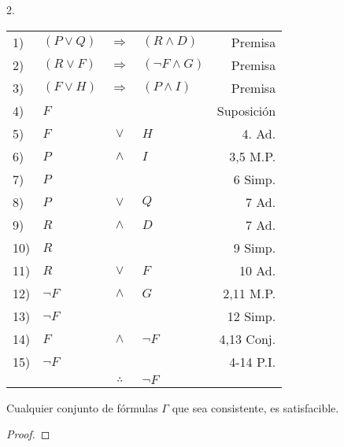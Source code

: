 \documentclass[12pt]{report}
\theoremstyle{largebreak}
\begin{document}
\begin{excer}
        2.
        \begin{center}
            \begin{tabular}{l l c l r}
                1) & $(P\lor Q)$ & $\Rightarrow$ & $(R\land D)$ & Premisa \\
                2) & $(R\lor F)$ & $\Rightarrow$ & $(\neg F\land G)$ & Premisa \\
                3) & $(F\lor H)$ & $\Rightarrow$ & $(P\land I)$ & Premisa \\
                4) & $F$ &  &  & Suposición \\
                5) & $F$ & $\lor$ & $H$ & 4. Ad. \\
                6) & $P$ & $\land$ & $I$ & 3,5 M.P. \\
                7) & $P$ &  &  & 6 Simp. \\
                8) & $P$ & $\lor$ & $Q$ & 7 Ad. \\
                9) & $R$ & $\land$ & $D$ & 7 Ad. \\
                10) & $R$ &  &  & 9 Simp. \\
                11) & $R$ & $\lor$ & $ F$ & 10 Ad. \\
                12) & $\neg F$ & $\land$ & $G$ & 2,11 M.P. \\
                13) & $\neg F$ &  &  & 12 Simp. \\
                14) & $F$ & $\land$ & $\neg F$ & 4,13 Conj. \\
                15) & $\neg F$ &  &  & 4-14 P.I. \\
                \hline
                & & $\therefore$ & $\neg F$ & \\
            \end{tabular}
        \end{center}
    \end{excer}


    \begin{mydef}
        
    \end{mydef}

    \begin{theor}
        Cualquier conjunto de fórmulas $\Gamma$ que sea consistente, es satisfacible.
    \end{theor}

    \begin{proof}
        
    \end{proof}
\end{document}
